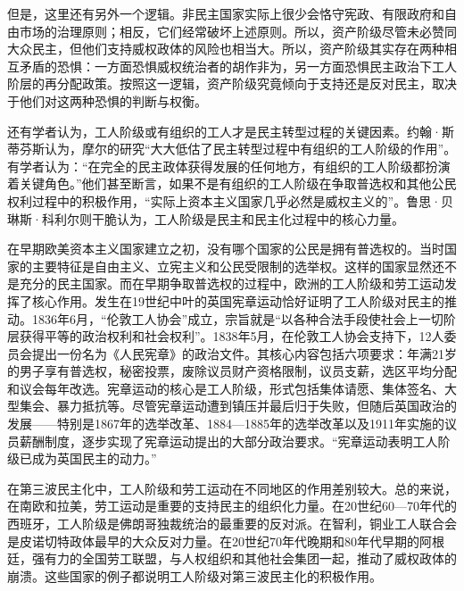 但是，这里还有另外一个逻辑。非民主国家实际上很少会恪守宪政、有限政府和自由市场的治理原则；相反，它们经常破坏上述原则。所以，资产阶级尽管未必赞同大众民主，但他们支持威权政体的风险也相当大。所以，资产阶级其实存在两种相互矛盾的恐惧：一方面恐惧威权统治者的胡作非为，另一方面恐惧民主政治下工人阶层的再分配政策。按照这一逻辑，资产阶级究竟倾向于支持还是反对民主，取决于他们对这两种恐惧的判断与权衡。

还有学者认为，工人阶级或有组织的工人才是民主转型过程的关键因素。约翰·斯蒂芬斯认为，摩尔的研究“大大低估了民主转型过程中有组织的工人阶级的作用”。有学者认为：“在完全的民主政体获得发展的任何地方，有组织的工人阶级都扮演着关键角色。”他们甚至断言，如果不是有组织的工人阶级在争取普选权和其他公民权利过程中的积极作用，“实际上资本主义国家几乎必然是威权主义的”。鲁思·贝琳斯·科利尔则干脆认为，工人阶级是民主和民主化过程中的核心力量。

在早期欧美资本主义国家建立之初，没有哪个国家的公民是拥有普选权的。当时国家的主要特征是自由主义、立宪主义和公民受限制的选举权。这样的国家显然还不是充分的民主国家。而在早期争取普选权的过程中，欧洲的工人阶级和劳工运动发挥了核心作用。发生在19世纪中叶的英国宪章运动恰好证明了工人阶级对民主的推动。1836年6月，“伦敦工人协会”成立，宗旨就是“以各种合法手段使社会上一切阶层获得平等的政治权利和社会权利”。1838年5月，在伦敦工人协会支持下，12人委员会提出一份名为《人民宪章》的政治文件。其核心内容包括六项要求：年满21岁的男子享有普选权，秘密投票，废除议员财产资格限制，议员支薪，选区平均分配和议会每年改选。宪章运动的核心是工人阶级，形式包括集体请愿、集体签名、大型集会、暴力抵抗等。尽管宪章运动遭到镇压并最后归于失败，但随后英国政治的发展——特别是1867年的选举改革、1884—1885年的选举改革以及1911年实施的议员薪酬制度，逐步实现了宪章运动提出的大部分政治要求。“宪章运动表明工人阶级已成为英国民主的动力。”

在第三波民主化中，工人阶级和劳工运动在不同地区的作用差别较大。总的来说，在南欧和拉美，劳工运动是重要的支持民主的组织化力量。在20世纪60—70年代的西班牙，工人阶级是佛朗哥独裁统治的最重要的反对派。在智利，铜业工人联合会是皮诺切特政体最早的大众反对力量。在20世纪70年代晚期和80年代早期的阿根廷，强有力的全国劳工联盟，与人权组织和其他社会集团一起，推动了威权政体的崩溃。这些国家的例子都说明工人阶级对第三波民主化的积极作用。

